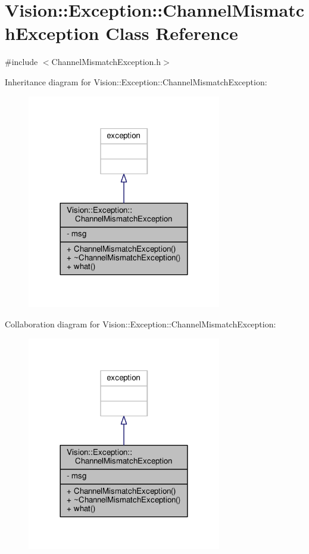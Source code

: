 \hypertarget{class_vision_1_1_exception_1_1_channel_mismatch_exception}{}\section{Vision\+:\+:Exception\+:\+:Channel\+Mismatch\+Exception Class Reference}
\label{class_vision_1_1_exception_1_1_channel_mismatch_exception}


{\ttfamily \#include $<$Channel\+Mismatch\+Exception.\+h$>$}



Inheritance diagram for Vision\+:\+:Exception\+:\+:Channel\+Mismatch\+Exception\+:\nopagebreak
\begin{figure}[H]
\begin{center}
\leavevmode
\includegraphics[width=240pt]{class_vision_1_1_exception_1_1_channel_mismatch_exception__inherit__graph}
\end{center}
\end{figure}


Collaboration diagram for Vision\+:\+:Exception\+:\+:Channel\+Mismatch\+Exception\+:\nopagebreak
\begin{figure}[H]
\begin{center}
\leavevmode
\includegraphics[width=240pt]{class_vision_1_1_exception_1_1_channel_mismatch_exception__coll__graph}
\end{center}
\end{figure}
